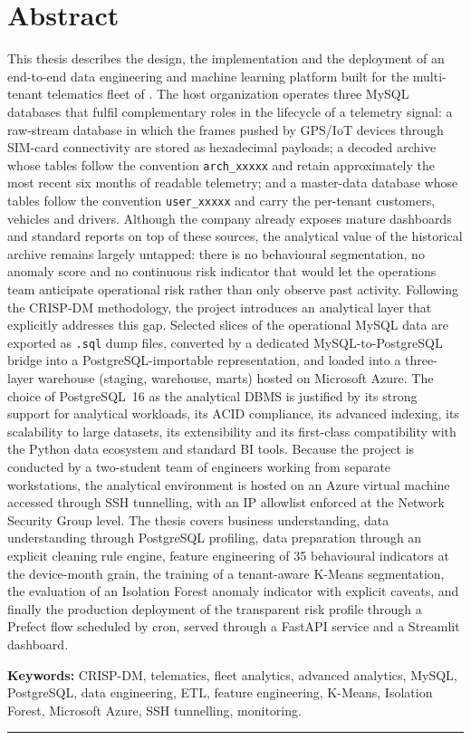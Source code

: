 \chapter*{Abstract}
\thispagestyle{plain}

This thesis describes the design, the implementation and the deployment of an end-to-end data engineering and machine learning platform built for the multi-tenant telematics fleet of \hostorg{}. The host organization operates three MySQL databases that fulfil complementary roles in the lifecycle of a telemetry signal: a raw-stream database in which the frames pushed by GPS/IoT devices through SIM-card connectivity are stored as hexadecimal payloads; a decoded archive whose tables follow the convention \texttt{arch\_xxxxx} and retain approximately the most recent six months of readable telemetry; and a master-data database whose tables follow the convention \texttt{user\_xxxxx} and carry the per-tenant customers, vehicles and drivers. Although the company already exposes mature dashboards and standard reports on top of these sources, the analytical value of the historical archive remains largely untapped: there is no behavioural segmentation, no anomaly score and no continuous risk indicator that would let the operations team anticipate operational risk rather than only observe past activity. Following the CRISP-DM methodology, the project introduces an analytical layer that explicitly addresses this gap. Selected slices of the operational MySQL data are exported as \texttt{.sql} dump files, converted by a dedicated MySQL-to-PostgreSQL bridge into a PostgreSQL-importable representation, and loaded into a three-layer warehouse (staging, warehouse, marts) hosted on Microsoft Azure. The choice of PostgreSQL~16 as the analytical DBMS is justified by its strong support for analytical workloads, its ACID compliance, its advanced indexing, its scalability to large datasets, its extensibility and its first-class compatibility with the Python data ecosystem and standard BI tools. Because the project is conducted by a two-student team of engineers working from separate workstations, the analytical environment is hosted on an Azure virtual machine accessed through SSH tunnelling, with an IP allowlist enforced at the Network Security Group level. The thesis covers business understanding, data understanding through PostgreSQL profiling, data preparation through an explicit cleaning rule engine, feature engineering of 35 behavioural indicators at the device-month grain, the training of a tenant-aware K-Means segmentation, the evaluation of an Isolation Forest anomaly indicator with explicit caveats, and finally the production deployment of the transparent risk profile through a Prefect flow scheduled by cron, served through a FastAPI service and a Streamlit dashboard.

\noindent\textbf{Keywords:} CRISP-DM, telematics, fleet analytics, advanced analytics, MySQL, PostgreSQL, data engineering, ETL, feature engineering, K-Means, Isolation Forest, Microsoft Azure, SSH tunnelling, monitoring.

\bigskip
\hrule
\bigskip

\cleardoublepage
